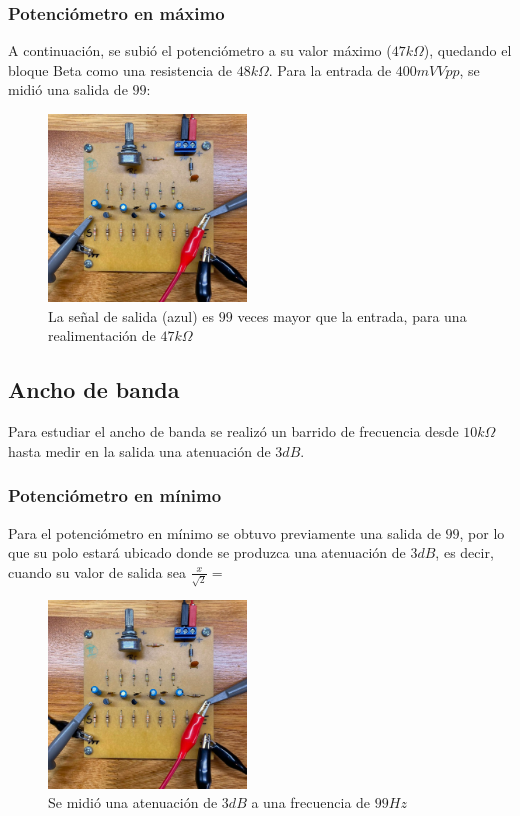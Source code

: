 \documentclass[letterpaper, 10 pt, conference]{ieeeconf}  %
\begin{document}
\subsubsection{Potenciómetro en máximo}

A continuación, se subió el potenciómetro a su valor máximo ($47k\Omega$), quedando el bloque Beta como una resistencia de $48k\Omega$.
Para la entrada de $400mV Vpp$, se midió una salida de $99$:

\begin{figure}[H]
  \centering
  \includegraphics[width=0.47\textwidth]{imagenes/placa conectada.jpg}
  \caption{La señal de salida (azul) es $99$ veces mayor que la entrada, para una realimentación de $47k\Omega$}
  \label{fig:osciloscopio_ganancia_pote_max}
\end{figure}

\subsection{Ancho de banda}

Para estudiar el ancho de banda se realizó un barrido de frecuencia desde $10k\Omega$ hasta medir en la salida una atenuación de $3dB$.\\

\subsubsection{Potenciómetro en mínimo}
Para el potenciómetro en mínimo se obtuvo previamente una salida de $99$, por lo que su polo estará ubicado donde se produzca una atenuación de $3dB$, es decir, cuando su valor de salida sea $\frac{x}{\sqrt{2}} = $

\begin{figure}[H]
  \centering
  \includegraphics[width=0.47\textwidth]{imagenes/placa conectada.jpg}
  \caption{Se midió una atenuación de $3dB$ a una frecuencia de $99Hz$}
  \label{fig:osciloscopio_freq_pote_min}
\end{figure}
\end{document}

